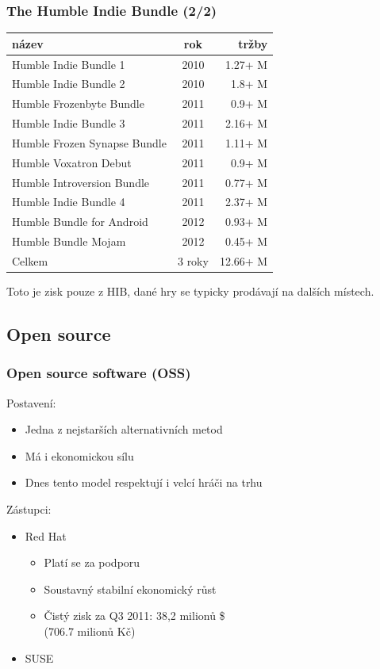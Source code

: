 \documentclass[xetex]{beamer}
\begin{document}
\begin{frame}
\frametitle{The Humble Indie Bundle (2/2)}

\begin{center}
\footnotesize{
\begin{tabular}{|l |c | r |}
\hline
název													&rok		&tržby\\
\hline
Humble Indie Bundle 1 					&2010		&1.27+ M\\
Humble Indie Bundle 2 					&2010		&1.8+ M\\
Humble Frozenbyte Bundle			&2011		&0.9+ M\\
Humble Indie Bundle 3					&2011		&2.16+ M\\
Humble Frozen Synapse Bundle	&2011		&1.11+ M\\
Humble Voxatron Debut					&2011		&0.9+ M\\
Humble Introversion Bundle			&2011		&0.77+ M\\
Humble Indie Bundle 4					&2011		&2.37+ M\\
Humble Bundle for Android			&2012		&0.93+ M\\
Humble Bundle Mojam					&2012		&0.45+ M\\
\hline
Celkem												&3 roky	&12.66+ M\\
\hline
\end{tabular}}

\medskip

\small{Toto je zisk pouze z HIB, dané hry se typicky prodávají na dalších místech.}
\end{center}
\end{frame}

\subsection{Open source}
\begin{frame}
  \frametitle{Open source software (OSS)}
Postavení:
	\begin{itemize}
		\item Jedna z nejstarších alternativních metod
		\item Má i ekonomickou sílu
		\item Dnes tento model respektují i velcí hráči na trhu
	\end{itemize}
Zástupci:
	\begin{itemize}
		\item Red Hat
			\begin{itemize}
				\item Platí se za podporu
				\item Soustavný stabilní ekonomický růst
				\item Čistý zisk za Q3 2011: 38,2 milionů \$\\ (706.7 milionů Kč)
			\end{itemize}
		\item SUSE
	\end{itemize}
\end{frame}
\end{document}
